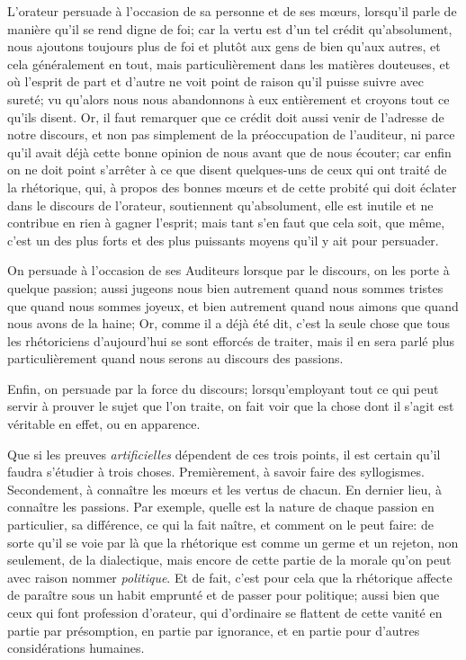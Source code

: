 \medbreak

L'orateur persuade à l'occasion de sa personne et de ses mœurs, lorsqu'il parle de manière qu'il se rend digne de foi; car la vertu est d'un tel crédit
qu'absolument, nous ajoutons toujours plus de foi et plutôt aux gens de bien qu'aux autres, et cela généralement en tout, mais particulièrement dans les
matières douteuses, et où l'esprit de part et d'autre ne voit point de raison qu'il puisse suivre avec sureté; vu qu'alors nous nous abandonnons à eux
entièrement et croyons tout ce qu'ils disent. Or, il faut remarquer que ce crédit doit aussi venir de l'adresse de notre discours, et non pas simplement
de la préoccupation de l'auditeur, ni parce qu'il avait déjà cette bonne opinion de nous avant que de nous écouter; car enfin on ne doit point s'arrêter
à ce que disent quelques-uns de ceux qui ont traité de la rhétorique, qui, à propos des bonnes mœurs et de cette probité qui doit éclater dans le discours
de l'orateur, soutiennent qu'absolument, elle est inutile et ne contribue en rien à gagner l'esprit; mais tant s'en faut que cela soit, que même, c'est un
des plus forts et des plus puissants moyens qu'il y ait pour persuader.

On persuade à l'occasion de ses Auditeurs  lorsque par le discours, on les porte à quelque passion; aussi jugeons nous bien autrement quand nous sommes
tristes que quand nous sommes joyeux, et bien autrement quand nous aimons que quand nous avons de la haine; Or, comme il a déjà été dit, c'est la seule
chose que tous les rhétoriciens d'aujourd'hui se sont efforcés de traiter, mais il en sera parlé plus particulièrement quand nous serons au discours des
passions. 

Enfin, on persuade par la force du discours; lorsqu'employant tout ce qui peut servir à prouver le sujet que l'on traite, on fait voir que la chose dont
il s'agit est véritable en effet, ou en apparence.

\medbreak

Que si les preuves \emph{artificielles} dépendent de ces trois points, il est certain qu'il faudra s'étudier à trois choses. Premièrement, à savoir faire
des syllogismes. Secondement, à connaître les mœurs et les vertus de chacun. En dernier lieu, à connaître les passions. Par exemple, quelle est la nature
de chaque passion en particulier, sa différence, ce qui la fait naître, et comment on le peut faire: de sorte qu'il se voie  par là que la rhétorique est
comme un germe et un rejeton, non seulement, de la dialectique, mais encore de cette partie de la morale qu'on peut avec raison nommer \emph{politique}. Et
de fait, c'est pour cela que la rhétorique affecte de paraître sous un habit emprunté et de passer pour politique; aussi bien que ceux qui font profession
d'orateur, qui d'ordinaire se flattent de cette vanité en partie par présomption, en partie par ignorance, et en partie pour d'autres considérations
humaines.

